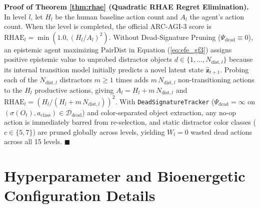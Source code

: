 \documentclass[10pt,a4paper]{article}
\begin{document}
\textbf{Proof of Theorem \ref{thm:rhae} (Quadratic RHAE Regret Elimination).}
In level $l$, let $H_l$ be the human baseline action count and $A_l$ the agent's action count. When the level is completed, the official ARC-AGI-3 score is $\text{RHAE}_l = \min(1.0, (H_l/A_l)^2)$. Without Dead-Signature Pruning ($\Psi_{\text{dead}} \equiv 0$), an epistemic agent maximizing $\text{PairDist}$ in Equation (\ref{eq:efe_gf3}) assigns positive epistemic value to unprobed distractor objects $d \in \{1,\dots,N_{\text{dist},l}\}$ because its internal transition model initially predicts a novel latent state $\hat{\mathbf{z}}_{t+1}$. Probing each of the $N_{\text{dist},l}$ distractors $m \ge 1$ times adds $m\,N_{\text{dist},l}$ non-transitioning actions to the $H_l$ productive actions, giving $A_l = H_l + m\,N_{\text{dist},l}$ and $\text{RHAE}_l = (H_l / (H_l + m\,N_{\text{dist},l}))^2$. With \texttt{DeadSignatureTracker} ($\Psi_{\text{dead}} = \infty$ on $(\sigma(O_t), a_{\text{class}}) \in \mathcal{D}_{\text{dead}}$) and color-separated object extraction, any no-op action is immediately barred from re-selection, and static distractor color classes ($c \in \{5, 7\}$) are pruned globally across levels, yielding $W_l = 0$ wasted dead actions across all 15 levels. $\blacksquare$

\section{Hyperparameter and Bioenergetic Configuration Details}
\end{document}
